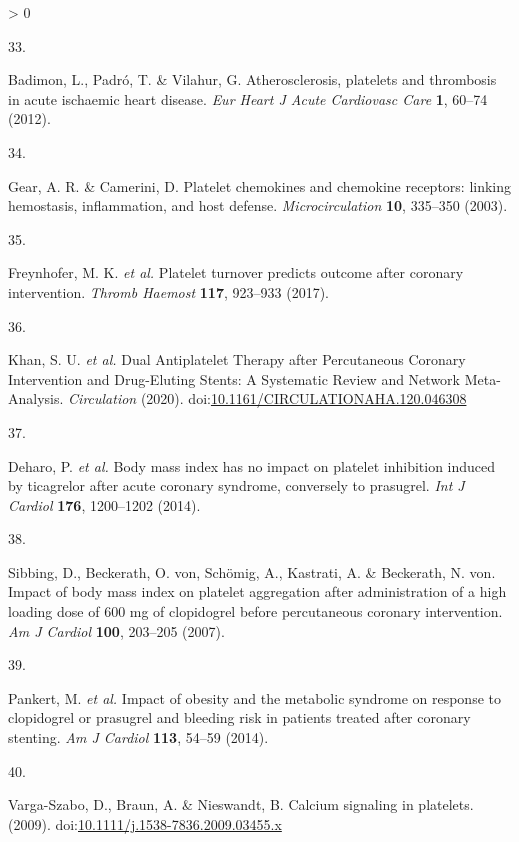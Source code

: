 \documentclass[11pt,twoside]{bristolthesis}
\newlength{\cslhangindent}
\newlength{\csllabelwidth}
\newenvironment{CSLReferences}[2] %
 {%
  \setlength{\parindent}{0pt}
  \ifodd #1 \everypar{\setlength{\hangindent}{\cslhangindent}}\ignorespaces\fi
  \ifnum #2 > 0
  \setlength{\parskip}{#2\baselineskip}
  \fi
 }%
 {}
\newcommand{\CSLLeftMargin}[1]{\parbox[t]{\csllabelwidth}{#1}}
\newcommand{\CSLRightInline}[1]{\parbox[t]{\linewidth - \csllabelwidth}{#1}\break}
\begin{document}
\begin{CSLReferences}{0}{0}
\leavevmode\hypertarget{ref-Badimon2012}{}%
\CSLLeftMargin{33. }
\CSLRightInline{Badimon, L., Padró, T. \& Vilahur, G. {Atherosclerosis, platelets and thrombosis in acute ischaemic heart disease}. \emph{Eur Heart J Acute Cardiovasc Care} \textbf{1}, 60--74 (2012).}

\leavevmode\hypertarget{ref-Gear2003}{}%
\CSLLeftMargin{34. }
\CSLRightInline{Gear, A. R. \& Camerini, D. {Platelet chemokines and chemokine receptors: linking hemostasis, inflammation, and host defense}. \emph{Microcirculation} \textbf{10}, 335--350 (2003).}

\leavevmode\hypertarget{ref-Freynhofer2017a}{}%
\CSLLeftMargin{35. }
\CSLRightInline{Freynhofer, M. K. \emph{et al.} {Platelet turnover predicts outcome after coronary intervention}. \emph{Thromb Haemost} \textbf{117}, 923--933 (2017).}

\leavevmode\hypertarget{ref-Khan2020}{}%
\CSLLeftMargin{36. }
\CSLRightInline{Khan, S. U. \emph{et al.} {Dual Antiplatelet Therapy after Percutaneous Coronary Intervention and Drug-Eluting Stents: A Systematic Review and Network Meta-Analysis}. \emph{Circulation} (2020). doi:\href{https://doi.org/10.1161/CIRCULATIONAHA.120.046308}{10.1161/CIRCULATIONAHA.120.046308}}

\leavevmode\hypertarget{ref-Deharo2014}{}%
\CSLLeftMargin{37. }
\CSLRightInline{Deharo, P. \emph{et al.} {Body mass index has no impact on platelet inhibition induced by ticagrelor after acute coronary syndrome, conversely to prasugrel}. \emph{Int J Cardiol} \textbf{176}, 1200--1202 (2014).}

\leavevmode\hypertarget{ref-Sibbing2007}{}%
\CSLLeftMargin{38. }
\CSLRightInline{Sibbing, D., Beckerath, O. von, Schömig, A., Kastrati, A. \& Beckerath, N. von. {Impact of body mass index on platelet aggregation after administration of a high loading dose of 600 mg of clopidogrel before percutaneous coronary intervention}. \emph{Am J Cardiol} \textbf{100}, 203--205 (2007).}

\leavevmode\hypertarget{ref-Pankert2014}{}%
\CSLLeftMargin{39. }
\CSLRightInline{Pankert, M. \emph{et al.} {Impact of obesity and the metabolic syndrome on response to clopidogrel or prasugrel and bleeding risk in patients treated after coronary stenting}. \emph{Am J Cardiol} \textbf{113}, 54--59 (2014).}

\leavevmode\hypertarget{ref-Varga-Szabo2009}{}%
\CSLLeftMargin{40. }
\CSLRightInline{Varga-Szabo, D., Braun, A. \& Nieswandt, B. {Calcium signaling in platelets}. (2009). doi:\href{https://doi.org/10.1111/j.1538-7836.2009.03455.x}{10.1111/j.1538-7836.2009.03455.x}}


\end{CSLReferences}
\end{document}

